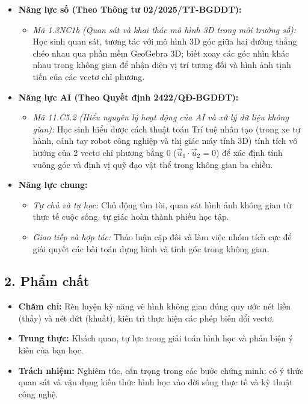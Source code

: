 \documentclass[12pt, a4paper]{article}
\renewcommand{\vec}[1]{\overrightarrow{#1}}
\begin{document}
\begin{itemize}[leftmargin=1.2cm]
    \item \textbf{Năng lực số (Theo Thông tư 02/2025/TT-BGDĐT):}
    \begin{itemize}[leftmargin=0.6cm]
        \item \textit{Mã 1.3NC1b (Quan sát và khai thác mô hình 3D trong môi trường số):} Học sinh quan sát, tương tác với mô hình 3D góc giữa hai đường thẳng chéo nhau qua phần mềm GeoGebra 3D; biết xoay các góc nhìn khác nhau trong không gian để nhận diện vị trí tương đối và hình ảnh tịnh tiến của các vectơ chỉ phương.
    \end{itemize}

    \item \textbf{Năng lực AI (Theo Quyết định 2422/QĐ-BGDĐT):}
    \begin{itemize}[leftmargin=0.6cm]
        \item \textit{Mã 11.C5.2 (Hiểu nguyên lý hoạt động của AI và xử lý dữ liệu không gian):} Học sinh hiểu được cách thuật toán Trí tuệ nhân tạo (trong xe tự hành, cánh tay robot công nghiệp và thị giác máy tính 3D) tính tích vô hướng của 2 vectơ chỉ phương bằng 0 ($\vec{u}_1 \cdot \vec{u}_2 = 0$) để xác định tính vuông góc và định vị quỹ đạo vật thể trong không gian ba chiều.
    \end{itemize}

    \item \textbf{Năng lực chung:}
    \begin{itemize}[leftmargin=0.6cm]
        \item \textit{Tự chủ và tự học:} Chủ động tìm tòi, quan sát hình ảnh không gian từ thực tế cuộc sống, tự giác hoàn thành phiếu học tập.
        \item \textit{Giao tiếp và hợp tác:} Thảo luận cặp đôi và làm việc nhóm tích cực để giải quyết các bài toán dựng hình và tính góc trong không gian.
    \end{itemize}
\end{itemize}

\subsection*{2. Phẩm chất}

\begin{itemize}[leftmargin=1.2cm]
    \item \textbf{Chăm chỉ:} Rèn luyện kỹ năng vẽ hình không gian đúng quy ước nét liền (thấy) và nét đứt (khuất), kiên trì thực hiện các phép biến đổi vectơ.
    \item \textbf{Trung thực:} Khách quan, tự lực trong giải toán hình học và phản biện ý kiến của bạn học.
    \item \textbf{Trách nhiệm:} Nghiêm túc, cẩn trọng trong các bước chứng minh; có ý thức quan sát và vận dụng kiến thức hình học vào đời sống thực tế và kỹ thuật công nghệ.
\end{itemize}
\end{document}
